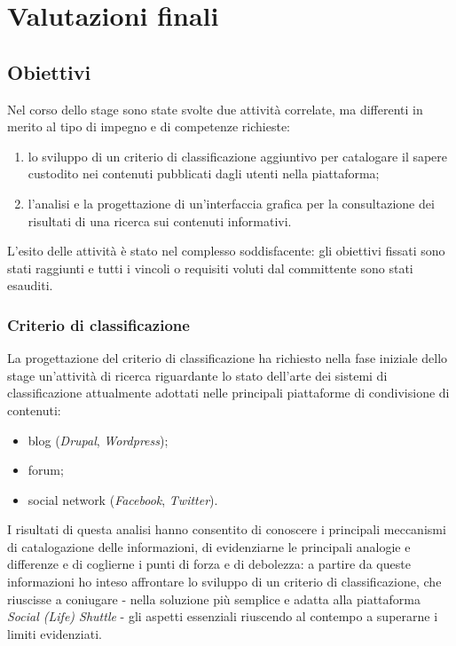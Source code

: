 \chapter{Valutazioni finali}
\label{ch:tesi:valutazioni}

\section{Obiettivi}
Nel corso dello stage sono state svolte due attività correlate, ma differenti in merito al tipo di impegno e di competenze richieste:
\begin{enumerate}
  \item lo sviluppo di un criterio di classificazione aggiuntivo per catalogare il sapere custodito nei contenuti pubblicati dagli utenti nella piattaforma;
  \item l'analisi e la progettazione di un'interfaccia grafica per la consultazione dei risultati di una ricerca sui contenuti informativi.
\end{enumerate}

L'esito delle attività è stato nel complesso soddisfacente: gli obiettivi fissati sono stati raggiunti e tutti i vincoli o requisiti voluti dal committente sono stati esauditi.

\subsection{Criterio di classificazione}
La progettazione del criterio di classificazione ha richiesto nella fase iniziale dello stage un'attività di ricerca riguardante lo stato dell'arte dei sistemi di classificazione attualmente adottati nelle principali piattaforme di condivisione di contenuti:
\begin{itemize}
  \item blog (\textit{Drupal}, \textit{Wordpress});
  \item forum;
  \item social network (\textit{Facebook}, \textit{Twitter}).
\end{itemize}

I risultati di questa analisi hanno consentito di conoscere i principali meccanismi di catalogazione delle informazioni, di evidenziarne le principali analogie e differenze e di coglierne i punti di forza e di debolezza: a partire da queste informazioni ho inteso affrontare lo sviluppo di un criterio di classificazione, che riuscisse a coniugare - nella soluzione più semplice e adatta alla piattaforma \textit{Social (Life) Shuttle} - gli aspetti essenziali riuscendo al contempo a superarne i limiti evidenziati.

